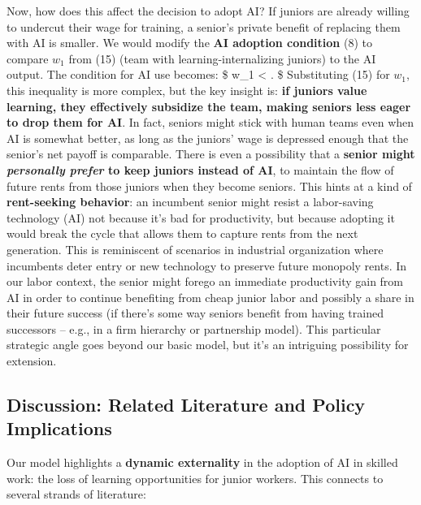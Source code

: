 \documentclass[12pt]{article}
\begin{document}
Now, how does this affect the decision to adopt AI? If juniors are
already willing to undercut their wage for training, a senior's private
benefit of replacing them with AI is smaller. We would modify the
\textbf{AI adoption condition} (8) to compare \(w_1\) from (15) (team
with learning-internalizing juniors) to the AI output. The condition for
AI use becomes: \$ w\_1 
\textless{} . \$ Substituting (15) for
\(w_1\), this inequality is more complex, but the key insight is:
\textbf{if juniors value learning, they effectively subsidize the team,
making seniors less eager to drop them for AI}. In fact, seniors might
stick with human teams even when AI is somewhat better, as long as the
juniors' wage is depressed enough that the senior's net payoff is
comparable. There is even a possibility that a \textbf{senior might
\emph{personally prefer} to keep juniors instead of AI}, to maintain the
flow of future rents from those juniors when they become seniors. This
hints at a kind of \textbf{rent-seeking behavior}: an incumbent senior
might resist a labor-saving technology (AI) not because it's bad for
productivity, but because adopting it would break the cycle that allows
them to capture rents from the next generation. This is reminiscent of
scenarios in industrial organization where incumbents deter entry or new
technology to preserve future monopoly rents. In our labor context, the
senior might forego an immediate productivity gain from AI in order to
continue benefiting from cheap junior labor and possibly a share in
their future success (if there's some way seniors benefit from having
trained successors -- e.g., in a firm hierarchy or partnership model).
This particular strategic angle goes beyond our basic model, but it's an
intriguing possibility for extension.

\subsection{Discussion: Related Literature and Policy
Implications}\label{discussion-related-literature-and-policy-implications}

Our model highlights a \textbf{dynamic externality} in the adoption of
AI in skilled work: the loss of learning opportunities for junior
workers. This connects to several strands of literature:
\end{document}
